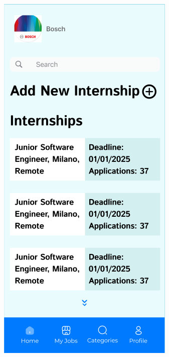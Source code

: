 \begin{figure}[ht]
    \centering
    \begin{minipage}{0.45\textwidth}
        \centering
        \includegraphics[width=\textwidth]{RASD-Latex/assets/UI images/mainpage_company_phone.png}

\end{minipage}
\end{figure}
